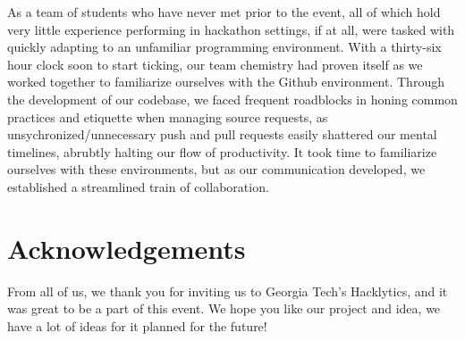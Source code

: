 \documentclass{article}
\begin{document}
As a team of students who have never met prior to the event, all of which hold very little experience performing
in hackathon settings, if at all, were tasked with quickly adapting to an unfamiliar programming environment.
With a thirty-six hour clock soon to start ticking, our team chemistry had proven itself as we worked together
to familiarize ourselves with the Github environment. Through the development of our codebase, we faced frequent
roadblocks in honing common practices and etiquette when managing source requests, as unsychronized/unnecessary
push and pull requests easily shattered our mental timelines, abrubtly halting our flow of productivity. It took
time to familiarize ourselves with these environments, but as our communication developed, we established
a streamlined train of collaboration.

\section*{Acknowledgements}
From all of us, we thank you for inviting us to Georgia Tech's Hacklytics, and it was great to be a part of this event. We hope you like our project and idea, we have a lot of ideas for it planned for the future!
\end{document}
